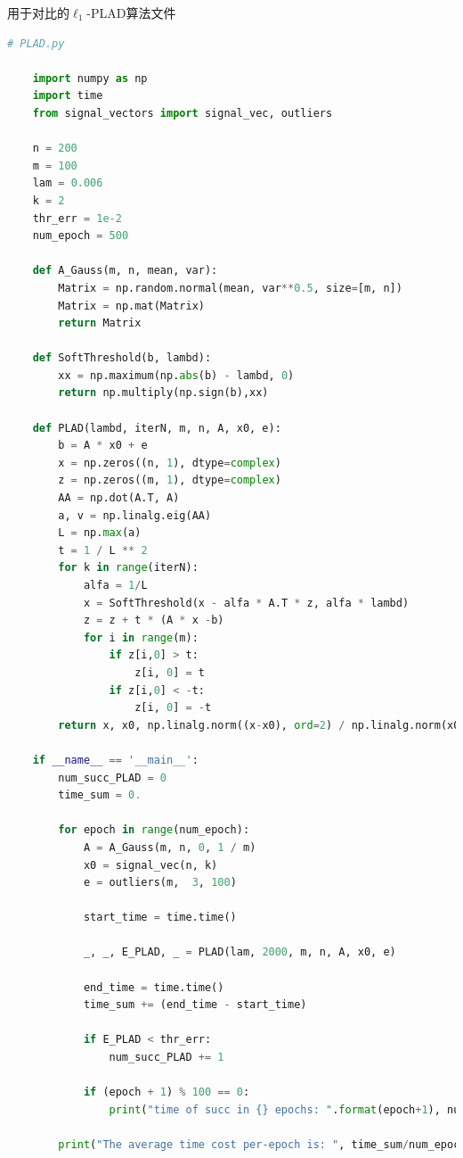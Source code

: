 \documentclass[AutoFakeBold]{LZUThesis}
\begin{document}
用于对比的$\ell_1$-PLAD算法文件

\begin{lstlisting}[language = python]
    # PLAD.py

    import numpy as np
    import time
    from signal_vectors import signal_vec, outliers

    n = 200
    m = 100
    lam = 0.006
    k = 2
    thr_err = 1e-2
    num_epoch = 500

    def A_Gauss(m, n, mean, var):
        Matrix = np.random.normal(mean, var**0.5, size=[m, n])
        Matrix = np.mat(Matrix)
        return Matrix

    def SoftThreshold(b, lambd):
        xx = np.maximum(np.abs(b) - lambd, 0)
        return np.multiply(np.sign(b),xx)

    def PLAD(lambd, iterN, m, n, A, x0, e):
        b = A * x0 + e
        x = np.zeros((n, 1), dtype=complex)
        z = np.zeros((m, 1), dtype=complex)
        AA = np.dot(A.T, A)
        a, v = np.linalg.eig(AA)
        L = np.max(a)
        t = 1 / L ** 2
        for k in range(iterN):
            alfa = 1/L
            x = SoftThreshold(x - alfa * A.T * z, alfa * lambd)
            z = z + t * (A * x -b)
            for i in range(m):
                if z[i,0] > t:
                    z[i, 0] = t
                if z[i,0] < -t:
                    z[i, 0] = -t
        return x, x0, np.linalg.norm((x-x0), ord=2) / np.linalg.norm(x0, ord=2), max(np.abs(A.T*e))

    if __name__ == '__main__':
        num_succ_PLAD = 0
        time_sum = 0.

        for epoch in range(num_epoch):
            A = A_Gauss(m, n, 0, 1 / m)
            x0 = signal_vec(n, k)
            e = outliers(m,  3, 100)

            start_time = time.time()

            _, _, E_PLAD, _ = PLAD(lam, 2000, m, n, A, x0, e)

            end_time = time.time()
            time_sum += (end_time - start_time)

            if E_PLAD < thr_err:
                num_succ_PLAD += 1

            if (epoch + 1) % 100 == 0:
                print("time of succ in {} epochs: ".format(epoch+1), num_succ_PLAD)

        print("The average time cost per-epoch is: ", time_sum/num_epoch)
\end{lstlisting}
\end{document}

